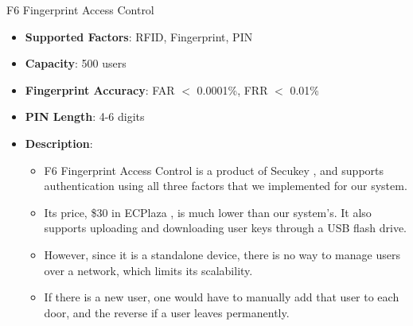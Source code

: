 \begin{frame}{F6 Fingerprint Access Control}
\begin{itemize}
    \item<1-> \textbf{Supported Factors}: RFID, Fingerprint, PIN
    \item<2-> \textbf{Capacity}: 500 users
    \item<3-> \textbf{Fingerprint Accuracy}: FAR $<$ 0.0001\%, FRR $<$ 0.01\%
    \item<4-> \textbf{PIN Length}: 4-6 digits
    \item<5-> \textbf{Description}: 
    \begin{itemize}
	    \item<6-> \scriptsize{F6 Fingerprint Access Control is a product of Secukey , and supports authentication using all three factors that we implemented for our system.}
	    \item<7-> \scriptsize{Its price, \$30 in ECPlaza , is much lower than our system's. It also supports uploading and downloading user keys through a USB flash drive.}
	    \item<8-> \scriptsize{However, since it is a standalone device, there is no way to manage users over a network, which limits its scalability.}
	    \item<9-> \scriptsize{If there is a new user, one would have to manually add that user to each door, and the reverse if a user leaves permanently.} 
	\end{itemize}
\end{itemize}
\end{frame}

